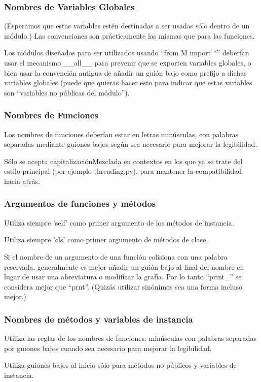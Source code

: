 \documentclass[a4paper,11pt,oneside]{book}
\begin{document}
\subsubsection{Nombres de Variables Globales}
(Esperamos que estas variables estén destinadas a ser usadas sólo dentro de un módulo.) Las convenciones son prácticamente las mismas que para las funciones.

Los módulos diseñados para ser utilizados usando ``from M import *'' deberían usar el mecanismo \_\_all\_\_ para prevenir que se exporten variables globales, o bien usar la convención antigua de añadir un guión bajo como prefijo a dichas variables globales (puede que quieras hacer esto para indicar que estas variables son ``variables no públicas del módulo'').
\subsubsection{Nombres de Funciones}
Los nombres de funciones deberían estar en letras minúsculas, con palabras separadas mediante guiones bajos según sea necesario para mejorar la legibilidad.

Sólo se acepta capitalizaciónMezclada en contextos en los que ya se trate del estilo principal (por ejemplo threading.py), para mantener la compatibilidad hacia atrás.
\subsubsection{Argumentos de funciones y métodos}
Utiliza siempre 'self'  como primer argumento de los métodos de instancia.

Utiliza siempre 'cls'  como primer argumento de métodos de clase.

Si el nombre de un argumento de una función colisiona con una palabra reservada, generalmente es mejor añadir un guión bajo al final del nombre en lugar de usar una abreviatura o modificar la grafía. Por lo tanto ``print\_'' se considera mejor que ``prnt''. (Quizás utilizar sinónimos sea una forma incluso mejor.)
\subsubsection{Nombres de métodos y variables de instancia}
Utiliza las reglas de los nombres de funciones: minúsculas con palabras separadas por guiones bajos cuando sea necesario para mejorar la legibilidad.

Utiliza guiones bajos al inicio sólo para métodos no públicos y variables de instancia.
\end{document}
